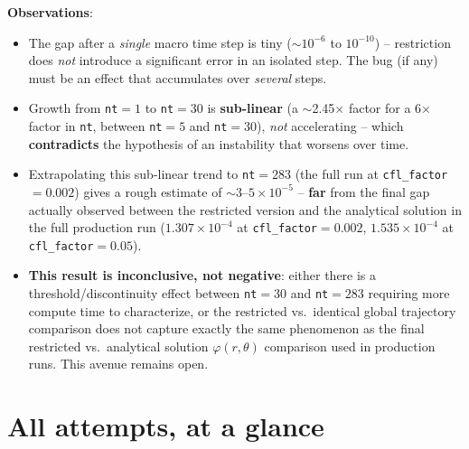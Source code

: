 \documentclass[11pt]{article}
\begin{document}
\textbf{Observations}:
\begin{itemize}
  \item The gap after a \emph{single} macro time step is tiny
  ($\sim10^{-6}$ to $10^{-10}$) -- restriction does \emph{not}
  introduce a significant error in an isolated step. The bug (if any)
  must be an effect that accumulates over \emph{several} steps.
  \item Growth from \texttt{nt}$=1$ to \texttt{nt}$=30$ is
  \textbf{sub-linear} (a $\sim$2.45$\times$ factor for a 6$\times$
  factor in \texttt{nt}, between \texttt{nt}$=5$ and \texttt{nt}$=30$),
  \emph{not} accelerating -- which \textbf{contradicts} the hypothesis
  of an instability that worsens over time.
  \item Extrapolating this sub-linear trend to \texttt{nt}$=283$ (the
  full run at \texttt{cfl\_factor}$=0.002$) gives a rough estimate of
  $\sim3$--$5\times10^{-5}$ -- \textbf{far} from the final gap actually
  observed between the restricted version and the analytical solution
  in the full production run ($1.307\times10^{-4}$ at
  \texttt{cfl\_factor}$=0.002$, $1.535\times10^{-4}$ at
  \texttt{cfl\_factor}$=0.05$).
  \item \textbf{This result is inconclusive, not negative}: either
  there is a threshold/discontinuity effect between \texttt{nt}$=30$
  and \texttt{nt}$=283$ requiring more compute time to characterize, or
  the \og restricted vs.\ identical global trajectory \fg{} comparison
  does not capture exactly the same phenomenon as the final \og
  restricted vs.\ analytical solution $\varphi(r,\theta)$ \fg{}
  comparison used in production runs. This avenue remains open.
\end{itemize}

\section{All attempts, at a glance}
\end{document}
